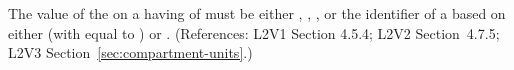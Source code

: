The value of the   on a \Compartment having
 of  must be either ,
, , or the identifier of a
\UnitDefinition based on either  (with  equal
to ) or .  (References: L2V1 Section 4.5.4;
L2V2 Section~4.7.5; L2V3 Section~\ref{sec:compartment-units}.)
